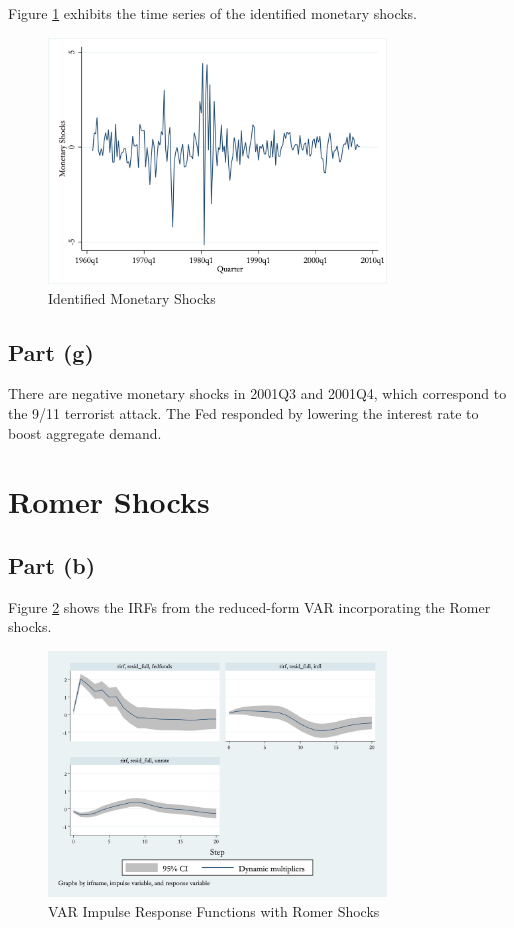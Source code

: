 \documentclass[12pt]{article}
\begin{document}
Figure \ref{fig:estimated_shocks} exhibits the time series of the identified monetary shocks.

\begin{figure}[ht]
    \centering
    \includegraphics[width=0.8\textwidth]{figs/estimated_monetary_shocks}
    \caption{Identified Monetary Shocks}
    \label{fig:estimated_shocks}
\end{figure}


\subsection*{Part (g)} 

There are negative monetary shocks in 2001Q3 and 2001Q4, 
which correspond to the 9/11 terrorist attack. 
The Fed responded by lowering the interest rate to boost aggregate demand. 


\section{Romer Shocks}


\subsection*{Part (b)} 

Figure \ref{fig:var_irf_rr} shows the IRFs from the reduced-form VAR incorporating the Romer shocks.

\begin{figure}[ht]
    \centering
    \includegraphics[width=0.8\textwidth]{figs/var_rirf.png}
    \caption{VAR Impulse Response Functions with Romer Shocks}
    \label{fig:var_irf_rr}
\end{figure}
\end{document}
